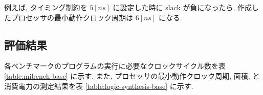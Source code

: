 \documentclass[../main.tex]{subfiles}
\begin{document}
  例えば, タイミング制約を $5[ns]$ に設定した時に slack が負になったら, 
  作成したプロセッサの最小動作クロック周期は $6[ns]$ になる.

  \subsection{評価結果}
  各ベンチマークのプログラムの実行に必要なクロックサイクル数を表 \ref{table:mibench-base} に示す.
  また, プロセッサの最小動作クロック周期, 面積, と消費電力の測定結果を表 \ref{table:logic-synthesis-base} に示す.

  \begin{table}[tbh]
    \centering
    \caption{ベンチマークプログラムの実行クロックサイクル数}
    \label{table:mibench-base}
  \end{table}

  \begin{table}[tbh]
    \centering
    \caption{論理合成の結果}
    \label{table:logic-synthesis-base}
  \end{table}
\end{document}
